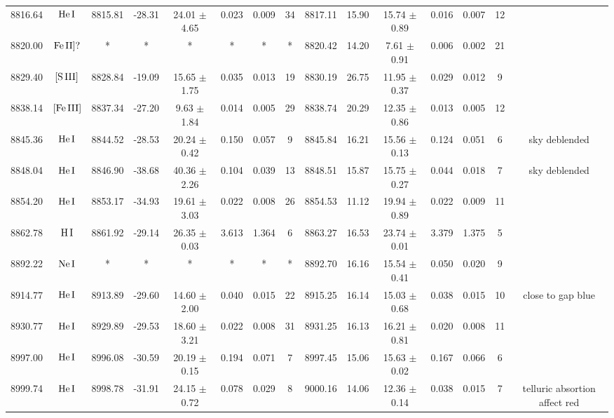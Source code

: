 \documentclass{article}
\begin{document}
\begin{table*}
\begin{adjustbox}{width=\textwidth}
\begin{tabular}{ccccccccccccccc}
8816.64 & $\mbox{He}\thinspace \mbox{I}$ & 8815.81 & -28.31 & 24.01 $\pm$ 4.65 & 0.023 & 0.009 & 34 & 8817.11 & 15.90 & 15.74 $\pm$ 0.89 & 0.016 & 0.007 & 12 &  \\
8820.00 & $\mbox{Fe}\thinspace \mbox{II]?}$ & * & * & * & * & * & * & 8820.42 & 14.20 & 7.61 $\pm$ 0.91 & 0.006 & 0.002 & 21 &  \\
8829.40 & $\mbox{[S}\thinspace \mbox{III]}$ & 8828.84 & -19.09 & 15.65 $\pm$ 1.75 & 0.035 & 0.013 & 19 & 8830.19 & 26.75 & 11.95 $\pm$ 0.37 & 0.029 & 0.012 & 9 &  \\
8838.14 & $\mbox{[Fe}\thinspace \mbox{III]}$ & 8837.34 & -27.20 & 9.63 $\pm$ 1.84 & 0.014 & 0.005 & 29 & 8838.74 & 20.29 & 12.35 $\pm$ 0.86 & 0.013 & 0.005 & 12 &  \\
8845.36 & $\mbox{He}\thinspace \mbox{I}$ & 8844.52 & -28.53 & 20.24 $\pm$ 0.42 & 0.150 & 0.057 & 9 & 8845.84 & 16.21 & 15.56 $\pm$ 0.13 & 0.124 & 0.051 & 6 &  sky deblended \\
8848.04 & $\mbox{He}\thinspace \mbox{I}$ & 8846.90 & -38.68 & 40.36 $\pm$ 2.26 & 0.104 & 0.039 & 13 & 8848.51 & 15.87 & 15.75 $\pm$ 0.27 & 0.044 & 0.018 & 7 &  sky deblended \\
8854.20 & $\mbox{He}\thinspace \mbox{I}$ & 8853.17 & -34.93 & 19.61 $\pm$ 3.03 & 0.022 & 0.008 & 26 & 8854.53 & 11.12 & 19.94 $\pm$ 0.89 & 0.022 & 0.009 & 11 &  \\
8862.78 & $\mbox{H}\thinspace \mbox{I}$ & 8861.92 & -29.14 & 26.35 $\pm$ 0.03 & 3.613 & 1.364 & 6 & 8863.27 & 16.53 & 23.74 $\pm$ 0.01 & 3.379 & 1.375 & 5 &  \\
8892.22 & $\mbox{Ne}\thinspace \mbox{I}$ & * & * & * & * & * & * & 8892.70 & 16.16 & 15.54 $\pm$ 0.41 & 0.050 & 0.020 & 9 &  \\
8914.77 & $\mbox{He}\thinspace \mbox{I}$ & 8913.89 & -29.60 & 14.60 $\pm$ 2.00 & 0.040 & 0.015 & 22 & 8915.25 & 16.14 & 15.03 $\pm$ 0.68 & 0.038 & 0.015 & 10 &  close to gap blue \\
8930.77 & $\mbox{He}\thinspace \mbox{I}$ & 8929.89 & -29.53 & 18.60 $\pm$ 3.21 & 0.022 & 0.008 & 31 & 8931.25 & 16.13 & 16.21 $\pm$ 0.81 & 0.020 & 0.008 & 11 &  \\
8997.00 & $\mbox{He}\thinspace \mbox{I}$ & 8996.08 & -30.59 & 20.19 $\pm$ 0.15 & 0.194 & 0.071 & 7 & 8997.45 & 15.06 & 15.63 $\pm$ 0.02 & 0.167 & 0.066 & 6 &  \\
8999.74 & $\mbox{He}\thinspace \mbox{I}$ & 8998.78 & -31.91 & 24.15 $\pm$ 0.72 & 0.078 & 0.029 & 8 & 9000.16 & 14.06 & 12.36 $\pm$ 0.14 & 0.038 & 0.015 & 7 &  telluric absortion affect red \\

\end{tabular}
\end{adjustbox}
\end{table*}
\end{document}
